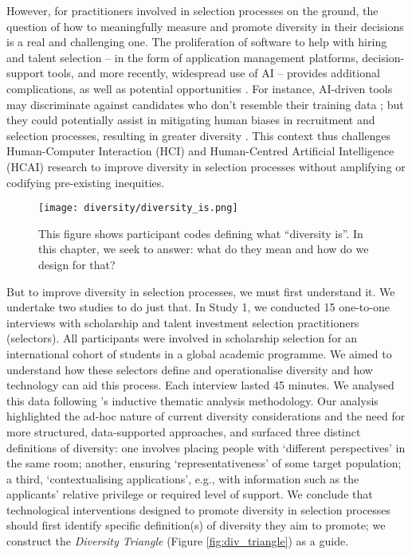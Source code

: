 However, for practitioners involved in selection processes on the ground, the question of how to meaningfully measure and promote diversity in their decisions is a real and challenging one. The proliferation of software to help with hiring and talent selection – in the form of application management platforms, decision-support tools, and more recently, widespread use of AI – provides additional complications, as well as potential opportunities \cite{Lashkari_Cheng_2023}. For instance, AI-driven tools may discriminate against candidates who don't resemble their training data \cite{chen2018investigating,li2020hiring,lambrecht2019algorithmic}; but they could potentially assist in mitigating human biases in recruitment and selection processes, resulting in greater diversity \cite{yarger2020algorithmic,avery2024does,will2023people, suhr2021does}. This context thus challenges Human-Computer Interaction (HCI) and Human-Centred Artificial Intelligence (HCAI) research to improve diversity in selection processes without amplifying or codifying pre-existing inequities.

\begin{figure}
    \texttt{[image: diversity/diversity\_is.png]}
    \caption{This figure shows participant codes defining what ``diversity is''. In this chapter, we seek to answer: what do they mean and how do we design for that?}
    \label{fig:diversity_is_teaser}
\end{figure}

But to improve diversity in selection processes, we must first understand it. We undertake two studies to do just that. In Study 1, we conducted 15 one-to-one interviews with scholarship and talent investment selection practitioners (selectors). All participants were involved in scholarship selection for an international cohort of students in a global academic programme. We aimed to understand how these selectors define and operationalise diversity and how technology can aid this process. Each interview lasted 45 minutes. We analysed this data following \textcite{braun_using_2006}'s inductive thematic analysis methodology. Our analysis highlighted the ad-hoc nature of current diversity considerations and the need for more structured, data-supported approaches, and surfaced three distinct definitions of diversity: one involves placing people with `different perspectives' in the same room; another, ensuring `representativeness' of some target population; a third, `contextualising applications', e.g., with information such as the applicants' relative privilege or required level of support. We conclude that technological interventions designed to promote diversity in selection processes should first identify specific definition(s) of diversity they aim to promote; we construct the \emph{Diversity Triangle} (Figure \ref{fig:div_triangle}) as a guide.


